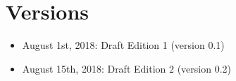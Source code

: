 \documentclass[12pt]{book}
\begin{document}
\newpage
\chapter*{Versions}

\noindent
\begin{itemize}
	\item August 1st, 2018: \hspace{2cm} Draft Edition 1 (version 0.1)
	\item August 15th, 2018: \hspace{2cm} Draft Edition 2 (version 0.2)
\end{itemize}



\ifx\wholebook\relax\else
% 
% 
	
\end{document}
